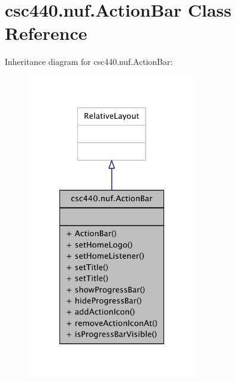 \hypertarget{classcsc440_1_1nuf_1_1_action_bar}{\section{csc440.\-nuf.\-Action\-Bar Class Reference}
\label{classcsc440_1_1nuf_1_1_action_bar}
}


Inheritance diagram for csc440.\-nuf.\-Action\-Bar\-:
\nopagebreak
\begin{figure}[H]
\begin{center}
\leavevmode
\includegraphics[width=210pt]{classcsc440_1_1nuf_1_1_action_bar__inherit__graph}
\end{center}
\end{figure}



